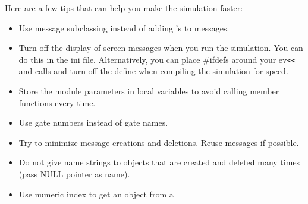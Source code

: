 Here are a few tips that can help you make the simulation faster:
\begin{itemize}
  \item{Use message subclassing instead of adding 's to messages.}
  \item{Turn off the display of screen messages when you run the
    simulation.  You can do this in the ini file. Alternatively, you
    can place \#ifdefs around your ev\texttt{<<} and
     calls and turn off the define when compiling
    the simulation for speed.}
  \item{Store the module parameters in local variables to avoid
    calling  member functions every time.}
  \item{Use gate numbers instead of gate names.}
  \item{Try to minimize message creations and deletions. Reuse
    messages if possible.}
  \item{Do not give name strings to objects that are created and
    deleted many times (pass NULL pointer as name).}
  \item{Use numeric index to get an object from a }
\end{itemize}



